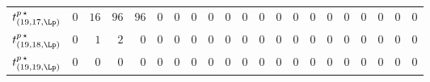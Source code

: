 \begin{tabular}{r|rrrrrrrrrrrrrrrrrrrr}
  $t^{p \, \star}_{(19,17,\Lp)}$ & $0$ & $16$ & $96$ & $96$ & $0$ & $0$ & $0$ & $0$ & $0$ & $0$ & $0$ & $0$ & $0$ & $0$ & $0$ & $0$ & $0$ & $0$ & $0$ & $0$ \\
  $t^{p \, \star}_{(19,18,\Lp)}$ & $0$ & $1$ & $2$ & $0$ & $0$ & $0$ & $0$ & $0$ & $0$ & $0$ & $0$ & $0$ & $0$ & $0$ & $0$ & $0$ & $0$ & $0$ & $0$ & $0$ \\
  $t^{p \, \star}_{(19,19,\Lp)}$ & $0$ & $0$ & $0$ & $0$ & $0$ & $0$ & $0$ & $0$ & $0$ & $0$ & $0$ & $0$ & $0$ & $0$ & $0$ & $0$ & $0$ & $0$ & $0$ & $0$ \\
\end{tabular}
